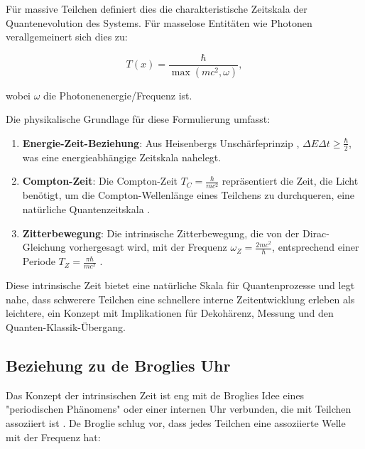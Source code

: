\documentclass[12pt,a4paper]{article}
\newcommand{\Tfield}{T(x)}
\begin{document}
	Für massive Teilchen definiert dies die charakteristische Zeitskala der Quantenevolution des Systems. Für masselose Entitäten wie Photonen verallgemeinert sich dies zu:
	
	\begin{equation}
		\Tfield = \frac{\hbar}{\max(mc^2, \omega)},
		\label{eq:intrinsic_time_general}
	\end{equation}
	
	wobei $\omega$ die Photonenenergie/Frequenz ist.
	
	Die physikalische Grundlage für diese Formulierung umfasst:
	
	\begin{enumerate}
		\item \textbf{Energie-Zeit-Beziehung}: Aus Heisenbergs Unschärfeprinzip \cite{Heisenberg1927, Mandelstam1945}, $\Delta E \Delta t \geq \frac{\hbar}{2}$, was eine energieabhängige Zeitskala nahelegt.
		
		\item \textbf{Compton-Zeit}: Die Compton-Zeit $T_C = \frac{\hbar}{mc^2}$ repräsentiert die Zeit, die Licht benötigt, um die Compton-Wellenlänge eines Teilchens zu durchqueren, eine natürliche Quantenzeitskala \cite{MacGibbon1987, Caldirola1953}.
		
		\item \textbf{Zitterbewegung}: Die intrinsische Zitterbewegung, die von der Dirac-Gleichung vorhergesagt wird, mit der Frequenz $\omega_Z = \frac{2mc^2}{\hbar}$, entsprechend einer Periode $T_Z = \frac{\pi\hbar}{mc^2}$ \cite{Dirac1928, Schrodinger1930, Hestenes1990}.
	\end{enumerate}
	
	Diese intrinsische Zeit bietet eine natürliche Skala für Quantenprozesse und legt nahe, dass schwerere Teilchen eine schnellere interne Zeitentwicklung erleben als leichtere, ein Konzept mit Implikationen für Dekohärenz, Messung und den Quanten-Klassik-Übergang.
	
	\subsection{Beziehung zu de Broglies Uhr}
	\label{subsec:debroglie_clock}
	
	Das Konzept der intrinsischen Zeit ist eng mit de Broglies Idee eines "periodischen Phänomens" oder einer internen Uhr verbunden, die mit Teilchen assoziiert ist \cite{deBroglie1923, deBroglie1924}. De Broglie schlug vor, dass jedes Teilchen eine assoziierte Welle mit der Frequenz hat:
	
\end{document}
